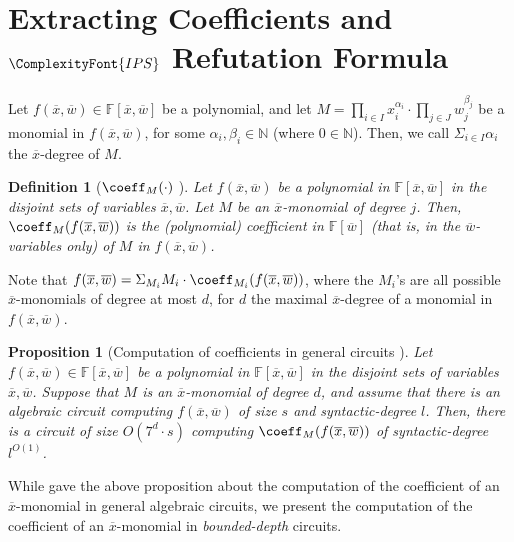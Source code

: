 \documentclass[11pt,letter]{article}
\newtheorem{definition}[theorem]{Definition}
\newtheorem{proposition}[theorem]{Proposition}
\theoremstyle{remark} %
\newcommand{\IPS}{%
    {
        \ComplexityFont{IPS} 
    }
}
\begin{document}
{\section{Extracting Coefficients and $\IPS$ Refutation Formula}
    Let $f(\overline{x},\overline{w}) \in \mathbb{F}[\overline{x}, \overline{w}]$ be a polynomial, and let $M=\prod_{i \in I} x_i^{\alpha_i} \cdot \prod_{j \in J}w_j^{\beta_j}$ be a monomial in $f(\overline{x},\overline{w})$, for some $\alpha_i,\beta_i \in \mathbb{N}$ (where $ 0 \in \mathbb{N}$). Then, we call $\Sigma_{i \in I}\alpha_i$ the $\overline{x}$-degree of $M$.
    \begin{definition}[$\coeff_M(\cdot)$ \cite{ST25}]
        \label{def: coefficient circuit}
        Let $f(\overline{x},\overline{w})$ be a polynomial in $\mathbb{F}[\overline{x},\overline{w}]$ in the disjoint sets of variables $\overline{x}, \overline{w}$. Let $M$ be an $\overline{x}$-monomial of degree $j$. Then, $\coeff_M(f(\overline{x},\overline{w}))$ is the (polynomial) coefficient in $\mathbb{F}[\overline{w}]$ (that is, in the $\overline{w}$-variables only) of $M$ in $f(\overline{x},\overline{w})$.
    \end{definition}
    Note that $f(\overline{x},\overline{w})=\Sigma_{M_i} M_i \cdot \coeff_{M_i}(f(\overline{x},\overline{w}))$, where the $M_i$'s are all possible $\overline{x}$-monomials of degree at most $d$, for $d$ the maximal $\overline{x}$-degree of a monomial in $f(\overline{x},\overline{w})$.
   

    \begin{proposition}[Computation of coefficients in general circuits \cite{ST25}]
        \label{prop: computation of coefficients in general circuits}
        Let $f(\overline{x},\overline{w}) \in \mathbb{F}[\overline{x},\overline{w}]$ be a polynomial in $\mathbb{F}[\overline{x},\overline{w}]$ in the disjoint sets of variables $\overline{x},\overline{w}$. Suppose that $M$ is an $\overline{x}$-monomial of degree $d$, and assume that there is an algebraic circuit computing $f(\overline{x},\overline{w})$ of size $s$ and syntactic-degree $l$. Then, there is a circuit of size $O(7^d\cdot s)$ computing $\coeff_M(f(\overline{x},\overline{w}))$ of syntactic-degree $l^{O(1)}$.
    \end{proposition}
    
    While \cite{ST25} gave the above proposition about the computation of the coefficient of an $\overline{x}$-monomial in general algebraic circuits, we present the computation of the coefficient of an  $\overline{x}$-monomial in \emph{bounded-depth} circuits.

}
\end{document}
